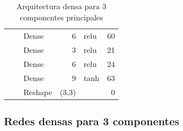 \begin{table}[]
\begin{center}
\begin{tabular}{ll|l|r|l|r|}
\multicolumn{1}{|l|}{}                              &                             & Dense                              & 6                                    & relu                                     & 60                                          \\ \cline{3-6} 
\multicolumn{1}{|l|}{}                              &                             & Dense                              & 3                                    & relu                                     & 21                                          \\ \cline{3-6} 
\multicolumn{1}{|l|}{}                              &                             & Dense                              & 6                                    & relu                                     & 24                                          \\ \cline{3-6} 
\multicolumn{1}{|l|}{}                              &                             & Dense                              & 9                                    & tanh                                     & 63                                          \\ \cline{3-6} 
\multicolumn{1}{|l|}{}                              &                             & Reshape                            & (3,3)                                &                                          & 0                                           \\ \hline
\end{tabular}
\end{center}
\caption{Arquitectura densa para 3 componentes principales}
\label{table:dense3_345}
\end{table}


\subsection{Redes densas para 3 componentes}
